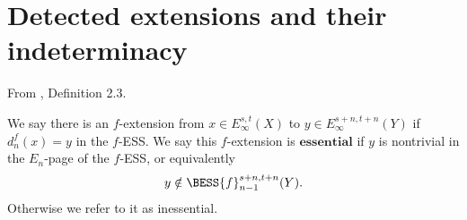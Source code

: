 \section{Detected extensions and their indeterminacy}

\begin{definition}
\label{paper:2.3}
From \cite{LWX126}, Definition 2.3.\par
\label{def:768fba8a}
    We say there is an $f$-extension from $x\in E_\infty^{s,t}(X)$ to $y\in E_\infty^{s+n,t+n}(Y)$ if $d_n^{f}(x)=y$ in the $f$-ESS. We say this $f$-extension is $\textbf{essential}$ if $y$ is nontrivial in the $E_n$-page of the $f$-ESS, or equivalently $$y\notin \BESS{f}^{s+n,t+n}_{n-1}(Y).$$
    Otherwise we refer to it as inessential.




\sketch
\end{definition}

